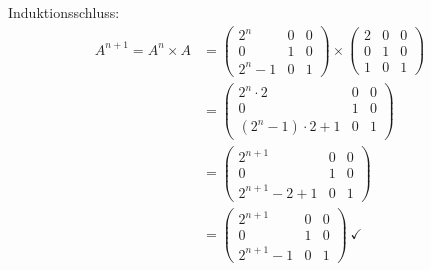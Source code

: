 \documentclass[main.tex]{subfiles}
\begin{document}
Induktionsschluss: 
\begin{equation*}
    \begin{aligned}
        A^{n+1} = A^n \times A & = \begin{pmatrix}
            2^n & 0 & 0 \\
            0 & 1 & 0 \\
            2^n -1 & 0 & 1
        \end{pmatrix} \times \begin{pmatrix}
            2 & 0 & 0 \\
            0 & 1 & 0 \\
            1 & 0 & 1
        \end{pmatrix} \\
        & = \begin{pmatrix}
            2^n\cdot 2 & 0 & 0 \\
            0 & 1 & 0 \\
            (2^n -1)\cdot 2 + 1 & 0 & 1
        \end{pmatrix}\\
        & = \begin{pmatrix}
            2^{n+1} & 0 & 0 \\
            0 & 1 & 0 \\
            2^{n+1} -2 + 1 & 0 & 1
        \end{pmatrix}\\
        & = \begin{pmatrix}
            2^{n+1} & 0 & 0 \\
            0 & 1 & 0 \\
            2^{n+1} -1 & 0 & 1
        \end{pmatrix}\ \checkmark
    \end{aligned}
\end{equation*}
\end{document}
